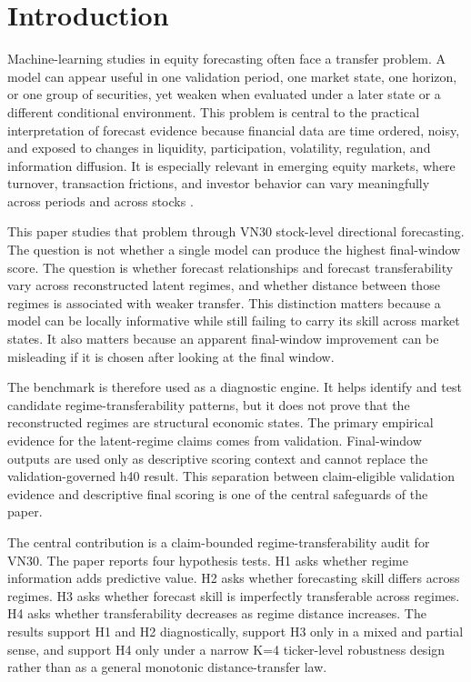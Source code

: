 \documentclass[12pt,a4paper]{article}
\begin{document}
\tableofcontents
\clearpage

\section{Introduction}

Machine-learning studies in equity forecasting often face a transfer problem. A model can appear useful in one validation period, one market state, one horizon, or one group of securities, yet weaken when evaluated under a later state or a different conditional environment. This problem is central to the practical interpretation of forecast evidence because financial data are time ordered, noisy, and exposed to changes in liquidity, participation, volatility, regulation, and information diffusion. It is especially relevant in emerging equity markets, where turnover, transaction frictions, and investor behavior can vary meaningfully across periods and across stocks \citep{Rouwenhorst1999,ChangChengKhorana2000,Lesmond2005,BekaertHarveyLundblad2007}.

This paper studies that problem through VN30 stock-level directional forecasting. The question is not whether a single model can produce the highest final-window score. The question is whether forecast relationships and forecast transferability vary across reconstructed latent regimes, and whether distance between those regimes is associated with weaker transfer. This distinction matters because a model can be locally informative while still failing to carry its skill across market states. It also matters because an apparent final-window improvement can be misleading if it is chosen after looking at the final window.

The benchmark is therefore used as a diagnostic engine. It helps identify and test candidate regime-transferability patterns, but it does not prove that the reconstructed regimes are structural economic states. The primary empirical evidence for the latent-regime claims comes from validation. Final-window outputs are used only as descriptive scoring context and cannot replace the validation-governed h40 result. This separation between claim-eligible validation evidence and descriptive final scoring is one of the central safeguards of the paper.

The central contribution is a claim-bounded regime-transferability audit for VN30. The paper reports four hypothesis tests. H1 asks whether regime information adds predictive value. H2 asks whether forecasting skill differs across regimes. H3 asks whether forecast skill is imperfectly transferable across regimes. H4 asks whether transferability decreases as regime distance increases. The results support H1 and H2 diagnostically, support H3 only in a mixed and partial sense, and support H4 only under a narrow K=4 ticker-level robustness design rather than as a general monotonic distance-transfer law.
\end{document}
